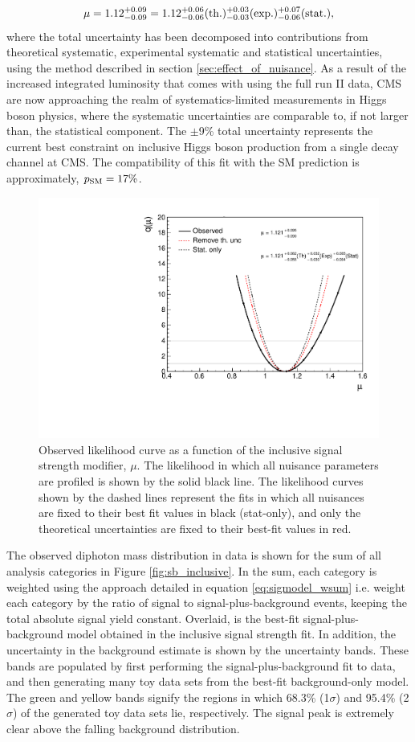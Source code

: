 \begin{equation*}
  \mu = 1.12 ^{+0.09}_{-0.09} = 1.12 ^{+0.06}_{-0.06}({\rm{th.}}) ^{+0.03}_{-0.03}({\rm{exp.}}) ^{+0.07}_{-0.06}({\rm{stat.}}),
\end{equation*}
\noindent
where the total uncertainty has been decomposed into contributions from theoretical systematic, experimental systematic and statistical uncertainties, using the method described in section \ref{sec:effect_of_nuisance}. As a result of the increased integrated luminosity that comes with using the full run II data, CMS are now approaching the realm of systematics-limited measurements in Higgs boson physics, where the systematic uncertainties are comparable to, if not larger than, the statistical component. The $\pm$9\% total uncertainty represents the current best constraint on inclusive Higgs boson production from a single decay channel at CMS. The compatibility of this fit with the SM prediction is approximately, $p_{\rm{SM}}=17\%$.

\begin{figure}[htb!]
  \centering
  \includegraphics[width=.6\textwidth]{Figures/hgg_results/likelihood_mu.pdf}
  \caption[Observed likelihood curve for the inclusive signal strength]
  {
    Observed likelihood curve as a function of the inclusive signal strength modifier, $\mu$. The likelihood in which all nuisance parameters are profiled is shown by the solid black line. The likelihood curves shown by the dashed lines represent the fits in which all nuisances are fixed to their best fit values in black (stat-only), and only the theoretical uncertainties are fixed to their best-fit values in red.
  }
  \label{fig:likelihood_mu_inclusive}
\end{figure}

The observed diphoton mass distribution in data is shown for the sum of all analysis categories in Figure \ref{fig:sb_inclusive}. In the sum, each category is weighted using the approach detailed in equation \ref{eq:sigmodel_wsum} i.e. weight each category by the ratio of signal to signal-plus-background events, keeping the total absolute signal yield constant. Overlaid, is the best-fit signal-plus-background model obtained in the inclusive signal strength fit. In addition, the uncertainty in the background estimate is shown by the uncertainty bands. These bands are populated by first performing the signal-plus-background fit to data, and then generating many toy data sets from the best-fit background-only model. The green and yellow bands signify the regions in which 68.3\% (1$\sigma$) and 95.4\% (2$\sigma$) of the generated toy data sets lie, respectively. The signal peak is extremely clear above the falling background distribution.


